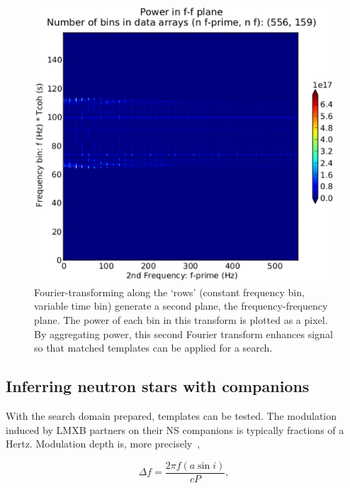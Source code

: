 \begin{figure}
\begin{center}
\includegraphics[trim=20 15 80 5, clip, width=0.7\paperwidth,height=0.35\paperheight]{ffplane-4e21-on-4e24.eps}
\caption{Fourier-transforming along the `rows' (constant frequency bin, variable time bin) generate a second plane, the frequency-frequency plane. The power of each bin in this transform is plotted as a pixel. By aggregating power, this second Fourier transform enhances signal so that matched templates can be applied for a search.}
\label{ffplane-figure}
\end{center}
\end{figure}

            \subsection{Inferring neutron stars with companions}
            \label{inference}
 
With the search domain prepared, templates can be tested.
The modulation induced by LMXB partners on their NS companions is typically fractions of a Hertz.
Modulation depth is, more precisely~\cite{GoetzTwoSpectMethods2011},

\begin{equation}
\Delta f = \frac{2 \pi f (a \sin i)}{c P},
\label{TwoSpect_mod_depth}
\end{equation}

